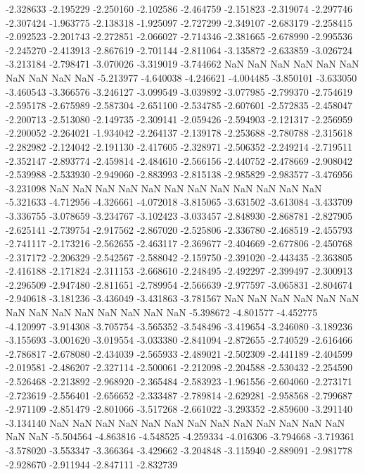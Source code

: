 -2.328633
-2.195229
-2.250160
-2.102586
-2.464759
-2.151823
-2.319074
-2.297746
-2.307424
-1.963775
-2.138318
-1.925097
-2.727299
-2.349107
-2.683179
-2.258415
-2.092523
-2.201743
-2.272851
-2.066027
-2.714346
-2.381665
-2.678990
-2.995536
-2.245270
-2.413913
-2.867619
-2.701144
-2.811064
-3.135872
-2.633859
-3.026724
-3.213184
-2.798471
-3.070026
-3.319019
-3.744662
NaN
NaN
NaN
NaN
NaN
NaN
NaN
NaN
NaN
NaN
-5.213977
-4.640038
-4.246621
-4.004485
-3.850101
-3.633050
-3.460543
-3.366576
-3.246127
-3.099549
-3.039892
-3.077985
-2.799370
-2.754619
-2.595178
-2.675989
-2.587304
-2.651100
-2.534785
-2.607601
-2.572835
-2.458047
-2.200713
-2.513080
-2.149735
-2.309141
-2.059426
-2.594903
-2.121317
-2.256959
-2.200052
-2.264021
-1.934042
-2.264137
-2.139178
-2.253688
-2.780788
-2.315618
-2.282982
-2.124042
-2.191130
-2.417605
-2.328971
-2.506352
-2.249214
-2.719511
-2.352147
-2.893774
-2.459814
-2.484610
-2.566156
-2.440752
-2.478669
-2.908042
-2.539988
-2.533930
-2.949060
-2.883993
-2.815138
-2.985829
-2.983577
-3.476956
-3.231098
NaN
NaN
NaN
NaN
NaN
NaN
NaN
NaN
NaN
NaN
NaN
NaN
-5.321633
-4.712956
-4.326661
-4.072018
-3.815065
-3.631502
-3.613084
-3.433709
-3.336755
-3.078659
-3.234767
-3.102423
-3.033457
-2.848930
-2.868781
-2.827905
-2.625141
-2.739754
-2.917562
-2.867020
-2.525806
-2.336780
-2.468519
-2.455793
-2.741117
-2.173216
-2.562655
-2.463117
-2.369677
-2.404669
-2.677806
-2.450768
-2.317172
-2.206329
-2.542567
-2.588042
-2.159750
-2.391020
-2.443435
-2.363805
-2.416188
-2.171824
-2.311153
-2.668610
-2.248495
-2.492297
-2.399497
-2.300913
-2.296509
-2.947480
-2.811651
-2.789954
-2.566639
-2.977597
-3.065831
-2.804674
-2.940618
-3.181236
-3.436049
-3.431863
-3.781567
NaN
NaN
NaN
NaN
NaN
NaN
NaN
NaN
NaN
NaN
NaN
NaN
NaN
NaN
-5.398672
-4.801577
-4.452775
-4.120997
-3.914308
-3.705754
-3.565352
-3.548496
-3.419654
-3.246080
-3.189236
-3.155693
-3.001620
-3.019554
-3.033380
-2.841094
-2.872655
-2.740529
-2.616466
-2.786817
-2.678080
-2.434039
-2.565933
-2.489021
-2.502309
-2.441189
-2.404599
-2.019581
-2.486207
-2.327114
-2.500061
-2.212098
-2.204588
-2.530432
-2.254590
-2.526468
-2.213892
-2.968920
-2.365484
-2.583923
-1.961556
-2.604060
-2.273171
-2.723619
-2.556401
-2.656652
-2.333487
-2.789814
-2.629281
-2.958568
-2.799687
-2.971109
-2.851479
-2.801066
-3.517268
-2.661022
-3.293352
-2.859600
-3.291140
-3.134140
NaN
NaN
NaN
NaN
NaN
NaN
NaN
NaN
NaN
NaN
NaN
NaN
NaN
NaN
NaN
-5.504564
-4.863816
-4.548525
-4.259334
-4.016306
-3.794668
-3.719361
-3.578020
-3.553347
-3.366364
-3.429662
-3.204848
-3.115940
-2.889091
-2.981778
-2.928670
-2.911944
-2.847111
-2.832739
